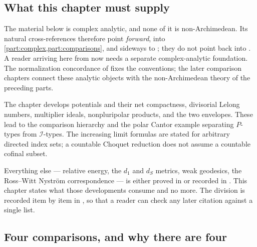 \subsection{What this chapter must supply}
\label{sec:ch51-what}

The material below is complex analytic, and none of it is
non-Archimedean.  Its natural cross-references therefore point
\emph{forward}, into \cref{part:complex,part:comparisons}, and sideways to
; they do not point back into
.  A reader arriving here from
 now needs a separate complex-analytic foundation.
The normalization concordance of  fixes the
conventions; the later comparison chapters connect these analytic objects
with the non-Archimedean theory of the preceding parts.

The chapter develops potentials and their net compactness, divisorial
Lelong numbers, multiplier ideals, nonpluripolar products, and the two
envelopes.  These lead to the comparison hierarchy and the polar Cantor
example separating $P$-types from $\mathcal I$-types.  The increasing
limit formulas are stated for arbitrary directed index sets; a countable
Choquet reduction does not assume a countable cofinal subset.

Everything else --- relative energy, the $d_1$ and $d_S$ metrics,
weak geodesics, the Ross--Witt Nystr\"om correspondence --- is either
proved in  or recorded in
.  This chapter states what those developments
consume and no more.  The division is recorded item by item in
, so that a reader can check any later citation
against a single list.

\subsection{Four comparisons, and why there are four}
\label{sec:ch51-four}

